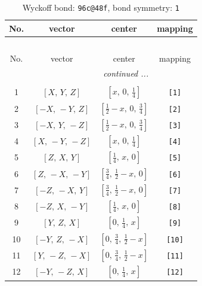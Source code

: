 \documentclass[fleqn,8pt]{jsarticle}
\begin{document}
\begin{longtable}{cccc}
\caption{Wyckoff bond: {\tt 96c@48f}, bond symmetry: {\tt 1}}
 \\
 \hline \hline
No. & vector & center & mapping \\ \hline \endfirsthead

\multicolumn{3}{l}{\tablename\ \thetable{}} \\
 \hline \hline
No. & vector & center & mapping \\ \hline \endhead

 \hline \hline
\multicolumn{3}{r}{\footnotesize\it continued ...} \\ \endfoot

 \hline \hline
\multicolumn{3}{r}{} \\ \endlastfoot

1 & $\left[ X,\, Y,\, Z \right]$ & $\left[ x,\, 0,\, \frac{1}{4} \right]$ & {\tt [1]} \\ \hline
2 & $\left[ - X,\, - Y,\, Z \right]$ & $\left[ \frac{1}{2} - x,\, 0,\, \frac{3}{4} \right]$ & {\tt [2]} \\ \hline
3 & $\left[ - X,\, Y,\, - Z \right]$ & $\left[ \frac{1}{2} - x,\, 0,\, \frac{3}{4} \right]$ & {\tt [3]} \\ \hline
4 & $\left[ X,\, - Y,\, - Z \right]$ & $\left[ x,\, 0,\, \frac{1}{4} \right]$ & {\tt [4]} \\ \hline
5 & $\left[ Z,\, X,\, Y \right]$ & $\left[ \frac{1}{4},\, x,\, 0 \right]$ & {\tt [5]} \\ \hline
6 & $\left[ Z,\, - X,\, - Y \right]$ & $\left[ \frac{3}{4},\, \frac{1}{2} - x,\, 0 \right]$ & {\tt [6]} \\ \hline
7 & $\left[ - Z,\, - X,\, Y \right]$ & $\left[ \frac{3}{4},\, \frac{1}{2} - x,\, 0 \right]$ & {\tt [7]} \\ \hline
8 & $\left[ - Z,\, X,\, - Y \right]$ & $\left[ \frac{1}{4},\, x,\, 0 \right]$ & {\tt [8]} \\ \hline
9 & $\left[ Y,\, Z,\, X \right]$ & $\left[ 0,\, \frac{1}{4},\, x \right]$ & {\tt [9]} \\ \hline
10 & $\left[ - Y,\, Z,\, - X \right]$ & $\left[ 0,\, \frac{3}{4},\, \frac{1}{2} - x \right]$ & {\tt [10]} \\ \hline
11 & $\left[ Y,\, - Z,\, - X \right]$ & $\left[ 0,\, \frac{3}{4},\, \frac{1}{2} - x \right]$ & {\tt [11]} \\ \hline
12 & $\left[ - Y,\, - Z,\, X \right]$ & $\left[ 0,\, \frac{1}{4},\, x \right]$ & {\tt [12]} \\ \hline

\end{longtable}
\end{document}
